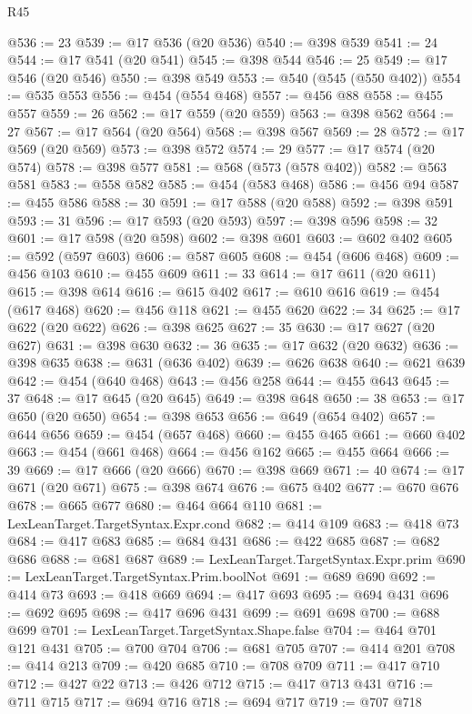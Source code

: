 \begin{lexlean}{R45}
\begin{coremodule}
{{{{{{{{{{{{{{{{{{{{{{{{{{{{{{{{{{{{{{{{{{{{{{{{{{{{{{{{{{{{{{{{{{{{{{{{{{{{{{{{{{{{{{{{{{{@536 := 23
@539 := @17 @536 (@20 @536)
@540 := @398 @539
@541 := 24
@544 := @17 @541 (@20 @541)
@545 := @398 @544
@546 := 25
@549 := @17 @546 (@20 @546)
@550 := @398 @549
@553 := @540 (@545 (@550 @402))
@554 := @535 @553
@556 := @454 (@554 @468)
@557 := @456 @88
@558 := @455 @557
@559 := 26
@562 := @17 @559 (@20 @559)
@563 := @398 @562
@564 := 27
@567 := @17 @564 (@20 @564)
@568 := @398 @567
@569 := 28
@572 := @17 @569 (@20 @569)
@573 := @398 @572
@574 := 29
@577 := @17 @574 (@20 @574)
@578 := @398 @577
@581 := @568 (@573 (@578 @402))
@582 := @563 @581
@583 := @558 @582
@585 := @454 (@583 @468)
@586 := @456 @94
@587 := @455 @586
@588 := 30
@591 := @17 @588 (@20 @588)
@592 := @398 @591
@593 := 31
@596 := @17 @593 (@20 @593)
@597 := @398 @596
@598 := 32
@601 := @17 @598 (@20 @598)
@602 := @398 @601
@603 := @602 @402
@605 := @592 (@597 @603)
@606 := @587 @605
@608 := @454 (@606 @468)
@609 := @456 @103
@610 := @455 @609
@611 := 33
@614 := @17 @611 (@20 @611)
@615 := @398 @614
@616 := @615 @402
@617 := @610 @616
@619 := @454 (@617 @468)
@620 := @456 @118
@621 := @455 @620
@622 := 34
@625 := @17 @622 (@20 @622)
@626 := @398 @625
@627 := 35
@630 := @17 @627 (@20 @627)
@631 := @398 @630
@632 := 36
@635 := @17 @632 (@20 @632)
@636 := @398 @635
@638 := @631 (@636 @402)
@639 := @626 @638
@640 := @621 @639
@642 := @454 (@640 @468)
@643 := @456 @258
@644 := @455 @643
@645 := 37
@648 := @17 @645 (@20 @645)
@649 := @398 @648
@650 := 38
@653 := @17 @650 (@20 @650)
@654 := @398 @653
@656 := @649 (@654 @402)
@657 := @644 @656
@659 := @454 (@657 @468)
@660 := @455 @465
@661 := @660 @402
@663 := @454 (@661 @468)
@664 := @456 @162
@665 := @455 @664
@666 := 39
@669 := @17 @666 (@20 @666)
@670 := @398 @669
@671 := 40
@674 := @17 @671 (@20 @671)
@675 := @398 @674
@676 := @675 @402
@677 := @670 @676
@678 := @665 @677
@680 := @464 @664 @110
@681 := LexLeanTarget.TargetSyntax.Expr.cond
@682 := @414 @109
@683 := @418 @73
@684 := @417 @683
@685 := @684 @431
@686 := @422 @685
@687 := @682 @686
@688 := @681 @687
@689 := LexLeanTarget.TargetSyntax.Expr.prim
@690 := LexLeanTarget.TargetSyntax.Prim.boolNot
@691 := @689 @690
@692 := @414 @73
@693 := @418 @669
@694 := @417 @693
@695 := @694 @431
@696 := @692 @695
@698 := @417 @696 @431
@699 := @691 @698
@700 := @688 @699
@701 := LexLeanTarget.TargetSyntax.Shape.false
@704 := @464 @701 @121 @431
@705 := @700 @704
@706 := @681 @705
@707 := @414 @201
@708 := @414 @213
@709 := @420 @685
@710 := @708 @709
@711 := @417 @710
@712 := @427 @22
@713 := @426 @712
@715 := @417 @713 @431
@716 := @711 @715
@717 := @694 @716
@718 := @694 @717
@719 := @707 @718
}}}}}}}}}}}}}}}}}}}}}}}}}}}}}}}}}}}}}}}}}}}}}}}}}}}}}}}}}}}}}}}}}}}}}}}}}}}}}}}}}}}}}}}}}}}
\end{coremodule}
\end{lexlean}
